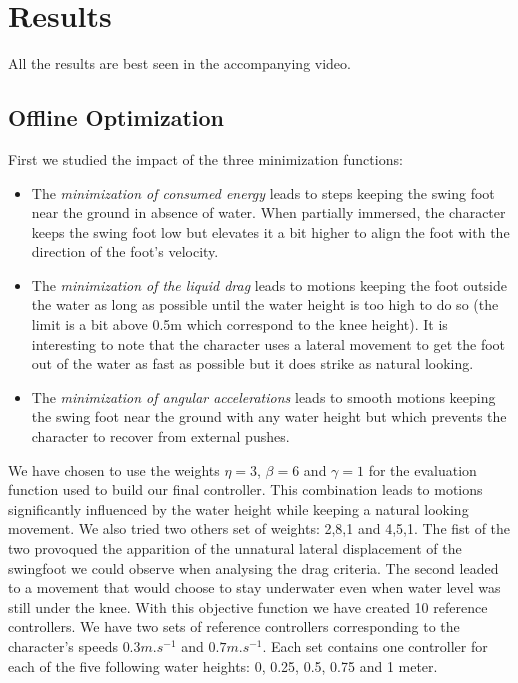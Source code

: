 \documentclass[conference]{acmsiggraph}
\begin{document}
\section{Results}
\label{sec:results}
All the results are best seen in the accompanying video.

\subsection{Offline Optimization}
First we studied the impact of the three minimization functions:
\begin{itemize}
\item\begin{minipage}[t]{\linewidth}{
The \textit{minimization of consumed energy} leads to steps keeping the swing foot near the ground in absence of water. When partially immersed, the character keeps the swing foot low but elevates it a bit higher to align the foot with the direction of the foot's velocity.}
\end{minipage}
\item\begin{minipage}[t]{\linewidth}{
The \textit{minimization of the liquid drag} leads to motions keeping the foot outside the water as long as possible until the water height is too high to do so (the limit is a bit above 0.5m which correspond to the knee height). It is interesting to note that the character uses a lateral movement to get the foot out of the water as fast as possible but it does strike as natural looking.}
\end{minipage}
\item\begin{minipage}[t]{\linewidth}{
The \textit{minimization of angular accelerations} leads to smooth motions keeping the swing foot near the ground with any water height but which prevents the character to recover from external pushes.}
\end{minipage}
\end{itemize}
We have chosen to use the weights $\eta=3$, $\beta=6$ and $\gamma=1$ for the evaluation function used to build our final controller. This combination leads to motions significantly influenced by the water height while keeping a natural looking movement. We also tried two others set of weights: 2,8,1 and 4,5,1. The fist of the two provoqued the apparition of the unnatural lateral displacement of the swingfoot we could observe when analysing the drag criteria. The second leaded to a movement that would choose to stay underwater even when water level was still under the knee.
With this objective function we have created 10 reference controllers. We have two sets of reference controllers corresponding to the character's speeds $0.3m.s^{-1}$ and $0.7m.s^{-1}$. Each set contains one controller for each of the five following water heights: 0, 0.25, 0.5, 0.75 and 1 meter.
\end{document}
